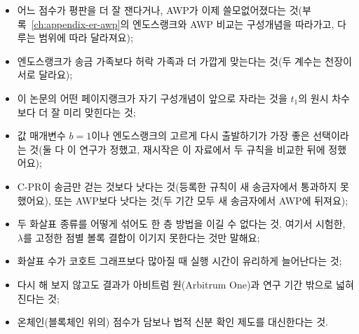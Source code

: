 \begin{itemize}
\item 어느 점수가 평판을 더 잘 잰다거나, AWP가 이제 쓸모없어졌다는 것(부록~\ref{ch:appendix-er-awp}의 엔도스랭크와 AWP 비교는 구성개념을 따라가고, 다루는 범위에 따라 달라져요);
\item 엔도스랭크가 송금 가족보다 허락 가족과 더 가깝게 맞는다는 것(두 계수는 천장이 서로 달라요);
\item 이 논문의 어떤 페이지랭크가 자기 구성개념이 앞으로 자라는 것을 $t_1$의 원시 차수보다 더 잘 미리 맞힌다는 것;
\item 값 매개변수 $b=1$이나 엔도스랭크의 고르게 다시 출발하기가 가장 좋은 선택이라는 것(둘 다 이 연구가 정했고, 재시작은 이 자료에서 두 규칙을 비교한 뒤에 정했어요);
\item C-PR이 송금만 걷는 것보다 낫다는 것(등록한 규칙이 새 송금자에서 통과하지 못했어요), 또는 AWP보다 낫다는 것(두 기간 모두 새 송금자에서 AWP에 뒤져요);
\item 두 화살표 종류를 어떻게 섞어도 한 층 방법을 이길 수 없다는 것. 여기서 시험한, $\lambda$를 고정한 점별 볼록 결합이 이기지 못한다는 것만 말해요;
\item 화살표 수가 코호트 그래프보다 많아질 때 실행 시간이 유리하게 늘어난다는 것;
\item 다시 해 보지 않고도 결과가 아비트럼 원(Arbitrum One)과 연구 기간 밖으로 넓혀진다는 것;
\item 온체인(블록체인 위의) 점수가 담보나 법적 신분 확인 제도를 대신한다는 것.
\end{itemize}


